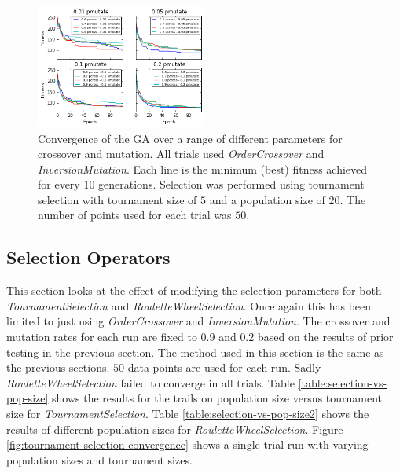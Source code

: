 \documentclass[journal]{IEEEtran}
\begin{document}
\begin{figure}[H]
\centering
\includegraphics[width=0.5\textwidth]{figures/cross_vs_mutate_params_convergence.png}
\caption{Convergence of the GA over a range of different parameters for crossover and mutation. All trials used \textit{OrderCrossover} and \textit{InversionMutation}. Each line is the minimum (best) fitness achieved for every 10 generations. Selection was performed using tournament selection with tournament size of $5$ and a population size of $20$. The number of points used for each trial was $50$.}
\label{fig:cross-vs-mutate-params}
\end{figure}

\subsection{Selection Operators}
This section looks at the effect of modifying the selection parameters for both \textit{TournamentSelection} and \textit{RouletteWheelSelection}. Once again this has been limited to just using \textit{OrderCrossover} and \textit{InversionMutation}. The crossover and mutation rates for each run are fixed to $0.9$ and $0.2$ based on the results of prior testing in the previous section. The method used in this section is the same as the previous sections. $50$ data points are used for each run. Sadly \textit{RouletteWheelSelection} failed to converge in all trials. Table \ref{table:selection-vs-pop-size} shows the results for the trails on population size versus tournament size for \textit{TournamentSelection}. Table \ref{table:selection-vs-pop-size2} shows the results of different population sizes for \textit{RouletteWheelSelection}. Figure \ref{fig:tournament-selection-convergence} shows a single trial run with varying population sizes and tournament sizes.
\end{document}
